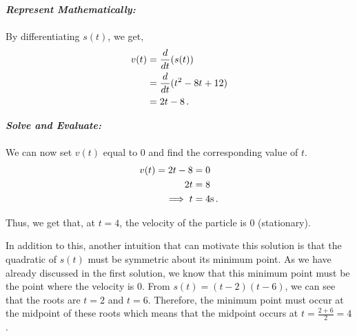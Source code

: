 \begin{subquestions}
\begin{subsubquestions}
\begin{subsubsubquestions}
			
			
			\textbf{\textit{Represent Mathematically:}} \\ \\
			By differentiating $s(t)$, we get,
			\begin{align}
				v(t) & = \frac{d}{dt}(s(t)) \nonumber \\
				     & = \frac{d}{dt}(t^2-8t+12) \nonumber \\
				     & = 2t - 8 \,.
			\end{align}
		
		
		
			\textbf{\textit{Solve and Evaluate:}} \\ \\
			We can now set $v(t)$ equal to 0 and find the corresponding value of $t$.
			\begin{align}
				v(t) = 2t-8 & = 0 \nonumber \\
				       2t & = 8 \nonumber \\
				       \implies t & = 4\text{s} \,.
			\end{align}
			
			Thus, we get that, at $t=4$, the velocity of the particle is 0 (stationary).
			
			In addition to this, another intuition that can motivate this solution is that the quadratic of $s(t)$ must be symmetric about its minimum point. As we have already discussed in the first solution, we know that this minimum point must be the point where the velocity is 0. From $s(t)=(t-2)(t-6)$, we can see that the roots are $t=2$ and $t=6$. Therefore, the minimum point must occur at the midpoint of these roots which means that the midpoint occurs at $t=\frac{2+6}{2}=4$.
		\end{subsubsubquestions}
		
	\end{subsubquestions}


\begin{subsubquestions}
	
	\subsubquestion
	

\end{subsubquestions}
\end{subquestions}
